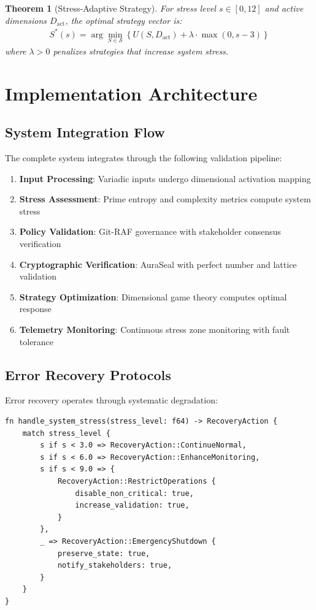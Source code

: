 \documentclass[a4paper,12pt]{article}
\newtheorem{theorem}{Theorem}
\begin{document}
\begin{theorem}[Stress-Adaptive Strategy]
For stress level $s \in [0,12]$ and active dimensions $D_{\text{act}}$, the optimal strategy vector is:
\begin{align}
S^*(s) = \arg\min_{S \in \mathcal{S}} \left\{ U(S, D_{\text{act}}) + \lambda \cdot \max(0, s - 3) \right\}
\end{align}
where $\lambda > 0$ penalizes strategies that increase system stress.
\end{theorem}

\section{Implementation Architecture}

\subsection{System Integration Flow}

The complete system integrates through the following validation pipeline:

\begin{enumerate}
\item \textbf{Input Processing}: Variadic inputs undergo dimensional activation mapping
\item \textbf{Stress Assessment}: Prime entropy and complexity metrics compute system stress
\item \textbf{Policy Validation}: Git-RAF governance with stakeholder consensus verification
\item \textbf{Cryptographic Verification}: AuraSeal with perfect number and lattice validation
\item \textbf{Strategy Optimization}: Dimensional game theory computes optimal response
\item \textbf{Telemetry Monitoring}: Continuous stress zone monitoring with fault tolerance
\end{enumerate}

\subsection{Error Recovery Protocols}

Error recovery operates through systematic degradation:

\begin{lstlisting}[style=rustcode, caption={Systematic error recovery}]
fn handle_system_stress(stress_level: f64) -> RecoveryAction {
    match stress_level {
        s if s < 3.0 => RecoveryAction::ContinueNormal,
        s if s < 6.0 => RecoveryAction::EnhanceMonitoring,
        s if s < 9.0 => {
            RecoveryAction::RestrictOperations {
                disable_non_critical: true,
                increase_validation: true,
            }
        },
        _ => RecoveryAction::EmergencyShutdown {
            preserve_state: true,
            notify_stakeholders: true,
        }
    }
}
\end{lstlisting}
\end{document}
